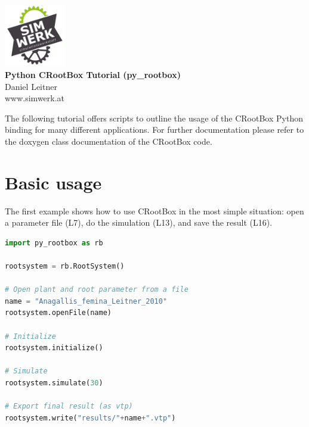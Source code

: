 \documentclass[a4paper]{article}
\begin{document}
\begin{center}
\includegraphics[width=0.2\textwidth]{sw_logo} \\
\vspace{0.5 cm}
\huge{\textbf{Python CRootBox Tutorial (py\_rootbox)}} \\
\vspace{0.5 cm}
\normalsize
Daniel Leitner \\
www.simwerk.at 
\end{center}

\vspace{0.5 cm}

\noindent 
The following tutorial offers scripts to outline the usage of the CRootBox Python binding for many different applications. 
For further documentation please refer to the doxygen class documentation of the CRootBox code.


\vspace{0.5 cm}

\tableofcontents


\section{Basic usage}
 
The first example shows how to use CRootBox in the most simple situation: open a parameter file (L7), do the simulation (L13), and save the result (L16). 

\begin{lstlisting}[language=Python, caption=Example 1a]
import py_rootbox as rb

rootsystem = rb.RootSystem()

# Open plant and root parameter from a file
name = "Anagallis_femina_Leitner_2010" 
rootsystem.openFile(name) 

# Initialize
rootsystem.initialize() 

# Simulate
rootsystem.simulate(30) 

# Export final result (as vtp)
rootsystem.write("results/"+name+".vtp") 
\end{lstlisting}
\end{document}
